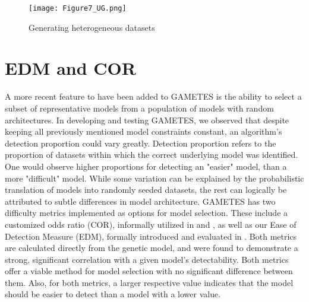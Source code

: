 \documentclass{report}
\begin{document}
\begin{figure}[t]
\centering
\texttt{[image: Figure7\_UG.png]}%
\caption{Generating heterogeneous datasets}
\label{hetfile}
\end{figure}

\section{EDM and COR} \label{moddiff}
A more recent feature to have been added to GAMETES is the ability to select a subset of representative models from a population of models with random architectures.   In developing and testing GAMETES, we observed that despite keeping all previously mentioned model constraints constant, an algorithm's detection proportion could vary greatly.  Detection proportion refers to the proportion of datasets within which the correct underlying model was identified.  One would observe higher proportions for detecting an "easier" model, than a more "difficult" model.  While some variation can be explained by the probabilistic translation of models into randomly seeded datasets, the rest can logically be attributed to subtle differences in model architecture.  GAMETES has two difficulty metrics implemented as options for model selection.  These include a customized odds ratio (COR), informally utilized in \cite{motsinger2008comparison} and \cite{edwards2009exploring}, as well as our Ease of Detection Measure (EDM), formally introduced and evaluated in \cite{urbanowicz2012predicting}.  Both metrics are calculated directly from the genetic model, and were found to demonstrate a strong, significant correlation with a given model's detectability.  Both metrics offer a viable method for model selection with no significant difference between them.  Also, for both metrics, a larger respective value indicates that the model should be easier to detect than a model with a lower value. 
\end{document}

